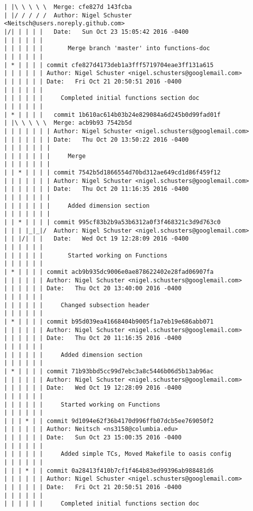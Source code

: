 \begin{lstlisting}
| |\ \ \ \ \  Merge: cfe827d 143fcba
| |/ / / / /  Author: Nigel Schuster <Neitsch@users.noreply.github.com>
|/| | | | |   Date:   Sun Oct 23 15:05:42 2016 -0400
| | | | | |   
| | | | | |       Merge branch 'master' into functions-doc
| | | | | |       
| * | | | | commit cfe827d4173deb1a3fff5719704eae3ff131a615
| | | | | | Author: Nigel Schuster <nigel.schusters@googlemail.com>
| | | | | | Date:   Fri Oct 21 20:50:51 2016 -0400
| | | | | | 
| | | | | |     Completed initial functions section doc
| | | | | |         
| * | | | |   commit 1b610ac614b03b24e829084a6d245b0d99fad01f
| |\ \ \ \ \  Merge: acb9b93 7542b5d
| | | | | | | Author: Nigel Schuster <nigel.schusters@googlemail.com>
| | | | | | | Date:   Thu Oct 20 13:50:22 2016 -0400
| | | | | | | 
| | | | | | |     Merge
| | | | | | |        
| | * | | | | commit 7542b5d1866554d70bd312ae649cd1d86f459f12
| | | | | | | Author: Nigel Schuster <nigel.schusters@googlemail.com>
| | | | | | | Date:   Thu Oct 20 11:16:35 2016 -0400
| | | | | | | 
| | | | | | |     Added dimension section
| | | | | | |        
| | * | | | | commit 995cf83b2b9a53b6312a0f3f468321c3d9d763c0
| | | |_|_|/  Author: Nigel Schuster <nigel.schusters@googlemail.com>
| | |/| | |   Date:   Wed Oct 19 12:28:09 2016 -0400
| | | | | |   
| | | | | |       Started working on Functions
| | | | | |       
| * | | | | commit acb9b935dc9006e0ae878622402e28fad06907fa
| | | | | | Author: Nigel Schuster <nigel.schusters@googlemail.com>
| | | | | | Date:   Thu Oct 20 13:40:00 2016 -0400
| | | | | | 
| | | | | |     Changed subsection header
| | | | | |       
| * | | | | commit b95d039ea41668404b9005f1a7eb19e686abb071
| | | | | | Author: Nigel Schuster <nigel.schusters@googlemail.com>
| | | | | | Date:   Thu Oct 20 11:16:35 2016 -0400
| | | | | | 
| | | | | |     Added dimension section
| | | | | |       
| * | | | | commit 71b93bbd5cc99d7ebc3a8c5446b06d5b13ab96ac
| | | | | | Author: Nigel Schuster <nigel.schusters@googlemail.com>
| | | | | | Date:   Wed Oct 19 12:28:09 2016 -0400
| | | | | | 
| | | | | |     Started working on Functions
| | | | | |       
| | | * | | commit 9d1094e62f36b4170d996ffb07dcb5ee769050f2
| | | | | | Author: Neitsch <ns3158@columbia.edu>
| | | | | | Date:   Sun Oct 23 15:00:35 2016 -0400
| | | | | | 
| | | | | |     Added simple TCs, Moved Makefile to oasis config
| | | | | |       
| | | * | | commit 0a28413f410b7cf1f464b83ed99396ab988481d6
| | | | | | Author: Nigel Schuster <nigel.schusters@googlemail.com>
| | | | | | Date:   Fri Oct 21 20:50:51 2016 -0400
| | | | | | 
| | | | | |     Completed initial functions section doc

\end{lstlisting}
